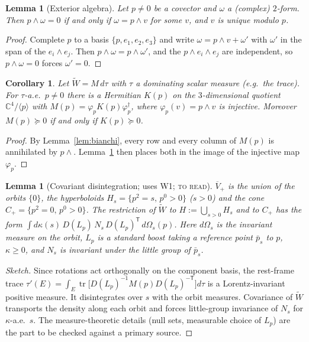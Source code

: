 \documentclass[11pt]{article}
\newtheorem{lemma}[theorem]{Lemma}
\newtheorem{corollary}[theorem]{Corollary}
\theoremstyle{remark}
\newcommand{\Wt}{\widetilde W}
\begin{document}
\begin{lemma}[Exterior algebra]\label{lem:ext}
Let $p\neq0$ be a covector and $\omega$ a (complex) $2$-form. Then
$p\wedge\omega=0$ if and only if $\omega=p\wedge v$ for some $v$, and $v$ is
unique modulo $p$.
\end{lemma}
\begin{proof}
Complete $p$ to a basis $\{p,e_1,e_2,e_3\}$ and write
$\omega=p\wedge v+\omega'$ with $\omega'$ in the span of the $e_i\wedge e_j$.
Then $p\wedge\omega=p\wedge\omega'$, and the $p\wedge e_i\wedge e_j$ are
independent, so $p\wedge\omega=0$ forces $\omega'=0$.
\end{proof}

\begin{corollary}\label{cor:K}
Let $\Wt=M\,d\tau$ with $\tau$ a dominating scalar measure (e.g.\ the trace).
For $\tau$-a.e.\ $p\neq0$ there is a Hermitian $K(p)$ on the $3$-dimensional
quotient $\mathbb C^4/\langle p\rangle$ with $M(p)=\varphi_p K(p)\varphi_p^\dagger$,
where $\varphi_p(v)=p\wedge v$ is injective. Moreover $M(p)\succeq0$ if and
only if $K(p)\succeq0$.
\end{corollary}
\begin{proof}
By Lemma~\ref{lem:bianchi}, every row and every column of $M(p)$ is
annihilated by $p\wedge$. Lemma~\ref{lem:ext} then places both in the image of
the injective map $\varphi_p$.
\end{proof}

\begin{lemma}[Covariant disintegration; uses W1; \textsc{to read}]\label{lem:disint}
$\overline V_+$ is the union of the orbits $\{0\}$, the hyperboloids
$H_s=\{p^2=s,\,p^0>0\}$ ($s>0$) and the cone $C_+=\{p^2=0,\,p^0>0\}$. The
restriction of $\Wt$ to $H:=\bigcup_{s>0}H_s$ and to $C_+$ has the form
$\int d\kappa(s)\,D(L_p)\,N_s\,D(L_p)^{\mathsf T}\,d\Omega_s(p)$. Here
$d\Omega_s$ is the invariant measure on the orbit, $L_p$ is a standard boost
taking a reference point $\bar p_s$ to $p$, $\kappa\ge0$, and $N_s$ is
invariant under the little group of $\bar p_s$.
\end{lemma}
\begin{proof}[Sketch]
Since rotations act orthogonally on the component basis, the rest-frame trace
$\tau'(E)=\int_E\operatorname{tr}\bigl[D(L_p)^{-1}M(p)D(L_p)^{-\mathsf T}\bigr]d\tau$
is a Lorentz-invariant positive measure. It disintegrates over $s$ with the
orbit measures. Covariance of $\Wt$ transports the density along each orbit and
forces little-group invariance of $N_s$ for $\kappa$-a.e.\ $s$. The
measure-theoretic details (null sets, measurable choice of $L_p$) are the part
to be checked against a primary source.
\end{proof}
\end{document}

